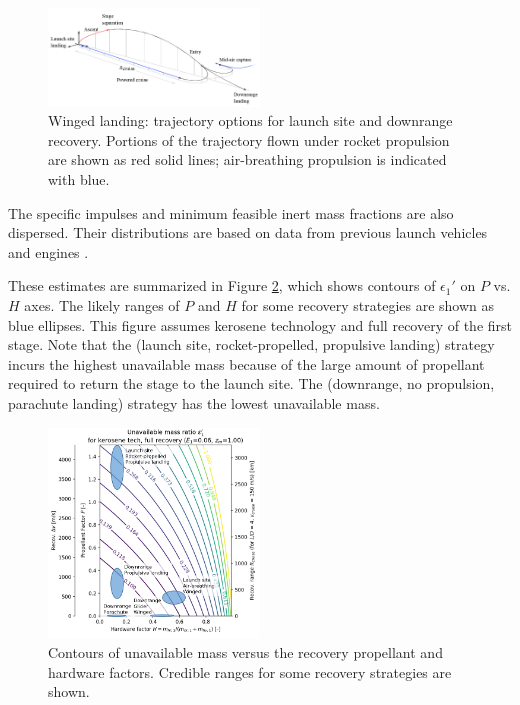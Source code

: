 \documentclass[conf]{new-aiaa}
\begin{document}
\begin{multicols}{2}
\begin{figure}[H]
    \centering
    \includegraphics[width=0.5\textwidth]{flyback_trajectory_cropped}
    \caption{\label{fig:flyback_trajectory} Winged landing: trajectory options for launch site and downrange recovery. Portions of the trajectory flown under rocket propulsion are shown as red solid lines; air-breathing propulsion is indicated with blue.}
\end{figure}

The specific impulses and minimum feasible inert mass fractions are also dispersed. Their distributions are based on data from previous launch vehicles and engines \cite{Isakowitz2004, hist_lpre}. 

These estimates are summarized in Figure \ref{fig:unavail_mass_contours}, which shows contours of $\epsilon_1'$ on $P$ vs. $H$ axes. The likely ranges of $P$ and $H$ for some recovery strategies are shown as blue ellipses. This figure assumes kerosene technology and full recovery of the first stage. Note that the (launch site, rocket-propelled, propulsive landing) strategy incurs the highest unavailable mass because of the large amount of propellant required to return the stage to the launch site. The (downrange, no propulsion, parachute landing) strategy has the lowest unavailable mass. 

\begin{figure}[H]
    \centering
    \includegraphics[width=0.5\textwidth]{unavail_mass_contours_annotated}
    \caption{\label{fig:unavail_mass_contours} Contours of unavailable mass versus the recovery propellant and hardware factors. Credible ranges for some recovery strategies are shown.}
\end{figure}



\end{multicols}
\end{document}
